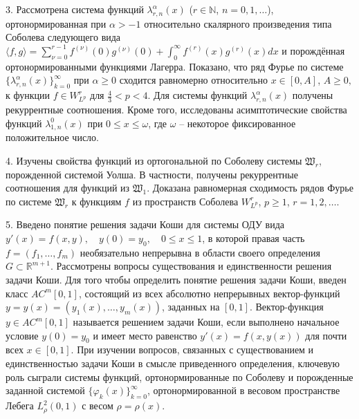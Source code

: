 3. Рассмотрена система функций $\lambda_{r,n}^{\alpha}(x)$ ($r\in\mathbb{N}$, $n=0, 1, \ldots$), ортонормированная при $\alpha>-1$ относительно скалярного произведения типа Соболева следующего вида $\langle f,g\rangle=\sum_{\nu=0}^{r-1}f^{(\nu)}(0)g^{(\nu)}(0)+\int_{0}^{\infty} f^{(r)}(x)g^{(r)}(x) dx$ и порождённая ортонормированными функциями Лагерра.
Показано, что ряд Фурье по системе $\{\lambda_{r,n}^{\alpha}(x)\}_{k=0}^\infty$ при $\alpha\geq0$ сходится равномерно относительно $x\in[0, A]$, $A\geq0,$ к функции $f\in W^r_{L^p}$ для $\frac{4}{3}<p<4$.
Для системы функций $\lambda_{r,n}^{\alpha}(x)$ получены рекуррентные соотношения.
Кроме того, исследованы асимптотические свойства функций $\lambda_{1,n}^0(x)$ при $0\leq x\leq\omega$, где $\omega$ -- некоторое фиксированное положительное число.

4. Изучены свойства функций из ортогональной по Соболеву системы $\mathfrak{W}_r$, порожденной системой Уолша. 
В частности, получены рекуррентные соотношения для функций из $\mathfrak{W}_1$.
Доказана равномерная сходимость рядов Фурье по системе $\mathfrak{W}_r$ к функциям $f$ из пространств Соболева $W^r_{L^p}$, $p \ge 1$, $r=1,2,\ldots$.

5. Введено понятие решения задачи Коши для системы ОДУ вида
$ y'(x)=f(x,y),\quad y(0)=y_0, \quad 0\le x\le 1$, в которой правая часть  $f=(f_1,\ldots,f_m)$ необязательно непрерывна в области своего определения $G\subset\mathbb{R}^{m+1}$. Рассмотрены вопросы существования и единственности решения задачи Коши. Для того чтобы определить понятие  решения задачи Коши, введен класс  $AC^m[0,1]$, состоящий из всех абсолютно непрерывных вектор-функций $y=y(x)=(y_1(x),\ldots,y_m(x))$, заданных на $[0,1]$.
Вектор-функция $y\in AC^m[0,1]$ называется решением задачи Коши, если выполнено начальное условие $y(0)=y_0$ и имеет место равенство $y'(x)=f(x,y(x))$ для почти всех $x\in[0,1]$.
При изучении вопросов, связанных с существованием и единственностью задачи Коши в смысле приведенного определения, ключевую роль сыграли системы функций, ортонормированные по Соболеву и порожденные заданной системой  $\{\varphi_k(x)\}_{k=0}^\infty$, ортонормированной в весовом пространстве Лебега $L_\rho^2(0,1)$  с весом $\rho=\rho(x)$. 